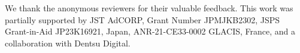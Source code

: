 \begin{acks}
We thank the anonymous reviewers for their valuable feedback.
This work was partially supported by JST AdCORP, Grant Number JPMJKB2302, JSPS Grant-in-Aid JP23K16921, Japan, ANR-21-CE33-0002 GLACIS, France, and a collaboration with Dentsu Digital.
\end{acks}
